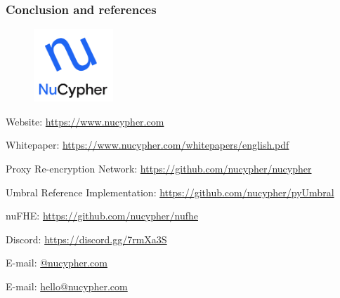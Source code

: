 \documentclass[xetex,mathsans,sans,aspectratio=169]{beamer}
\begin{document}
    \begin{frame}
        \frametitle{Conclusion and references}
        \begin{figure}
            \centering
            \includegraphics[width=3cm]{pdf/nucypher_logo.pdf}
        \end{figure}
        Website: \url{https://www.nucypher.com}

        Whitepaper: \url{https://www.nucypher.com/whitepapers/english.pdf}

        Proxy Re-encryption Network: \url{https://github.com/nucypher/nucypher}

        Umbral Reference Implementation: \url{https://github.com/nucypher/pyUmbral}

        nuFHE: \url{https://github.com/nucypher/nufhe}

        Discord: \url{https://discord.gg/7rmXa3S}

        E-mail: \href{mailto:\emailname @nucypher.com}{\emailname @nucypher.com}

        E-mail: \href{mailto:hello@nucypher.com}{hello@nucypher.com}
    \end{frame}
\end{document}
